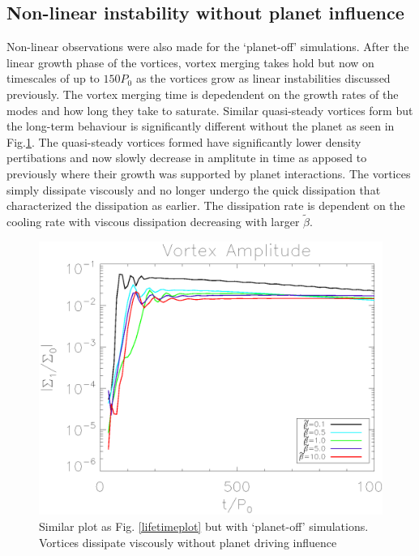 \subsection{Non-linear instability without planet influence} \label{nonlinearplanetoff}
Non-linear observations were also made for the `planet-off' simulations.
After the linear growth phase of the vortices, vortex merging takes hold but
 now on timescales of up to $150P_0$ as the vortices grow as linear
 instabilities discussed previously. The vortex merging time is depedendent on
 the growth rates of the modes and how long they take to saturate. Similar
 quasi-steady vortices form but the long-term behaviour is significantly
 different without the planet as seen in Fig.\ref{planetofflifetimeplot}.
 The quasi-steady vortices formed have significantly lower density pertibations
 and now slowly decrease in amplitute in time as apposed to previously
 where their growth was supported by planet interactions. The vortices simply
 dissipate viscously and no longer undergo the quick dissipation that
 characterized the dissipation as earlier. The dissipation rate is dependent
 on the cooling rate with viscous dissipation decreasing with larger
$\tilde\beta$.

\begin{figure}
  \includegraphics[width=\linewidth,clip=true,trim=0.5cm
    0cm 0cm 1.1cm]{figures/longterm_planetoff}
  \caption{Similar plot as Fig. \ref{lifetimeplot} but with `planet-off' simulations. Vortices dissipate viscously without planet driving influence} \label{planetofflifetimeplot}
\end{figure}

